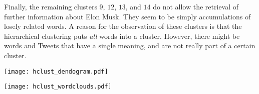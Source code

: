 Finally, the remaining clusters $9$, $12$, $13$, and $14$ do not allow the retrieval of further information about Elon Musk. They seem to be simply accumulations of losely related words. A reason for the observation of these clusters is that the hierarchical clustering puts \textit{all} words into a cluster. However, there might be words and Tweets that have a single meaning, and are not really part of a certain cluster. 

\begin{sidewaysfigure}
    \centering
    \texttt{[image: hclust\_dendogram.pdf]}
    \caption{Dendogram for the application of hierarchical clustering on the $140$ words of the term-document matrix of Elon Musk's Tweets. The vertical axis shows the value of the dissimilarity measure (in this case Ward's minimum variance method in combination with the binary distance) at the respective height. The red boxes and colorization of the different parts of the dendogram show the word categorization for $15$ clusters. A visualization of the words in the $15$ clusters is given in Fig.~\ref{fig:hclust_wordclouds}.}
    \label{fig:hclust_dendogram}
\end{sidewaysfigure}

\begin{sidewaysfigure}
    \centering
    \texttt{[image: hclust\_wordclouds.pdf]}
    \caption{Wordclouds of the $15$ clusters obtained from the application of hierarchical clustering in Fig.~\ref{fig:hclust_dendogram}. An interpretation of the clusters can be found in the main text.}
    \label{fig:hclust_wordclouds}
\end{sidewaysfigure}
